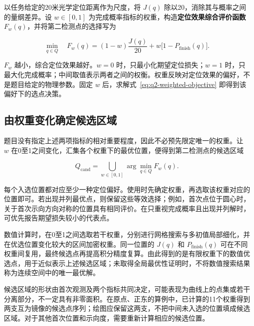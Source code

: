 以任务给定的20米光学定位距离作为尺度，将 \(J(q)\) 除以20，消除其与概率之间的量纲差异。设 \(w\in[0,1]\) 为完成概率指标的权重，构造\textbf{定位效果综合评价函数} \(F_w(q)\)，并将第二检测点的选择写为

\begin{equation}
 \min_{q\in Q}\quad F_w(q)
 =(1-w)\frac{J(q)}{20}+w\bigl[1-P_{\mathrm{finish}}(q)\bigr].
\label{eq:q2-weighted-objective}
\end{equation}

\(F_w\) 越小，综合定位效果越好。\(w=0\) 时，只最小化期望定位损失；\(w=1\) 时，只最大化完成概率；中间取值表示两者之间的权衡。权重反映对定位效果的偏好，不是题目给定的物理参数。固定 \(w\) 后，求解式~\eqref{eq:q2-weighted-objective} 即得到该偏好下的选点决策。

\subsection{由权重变化确定候选区域}

题目没有指定上述两项指标的相对重要程度，因此不必预先限定唯一的权重。让 \(w\) 在0至1之间变化，汇集各个权重下的最优位置，便得到第二检测点的候选区域

\begin{equation}
 Q_{\mathrm{cand}}=\bigcup_{w\in[0,1]}\arg\min_{q\in Q}F_w(q).
\label{eq:q2-candidate-region}
\end{equation}

每个入选位置都对应至少一种定位偏好。使用时先确定权重，再选取该权重对应的位置即可。若出现并列最优点，则保留这些等效选择；例如，首次点位于圆心时，关于首次示向方向对称的位置具有相同评价。在只重视完成概率且出现并列解时，可优先报告期望损失较小的代表点。

数值计算时，在0至1之间选取若干权重，分别进行网格搜索与多初值局部细化，并在优选位置变化较大的区间加密权重。同一位置的 \(J(q)\) 和 \(P_{\mathrm{finish}}(q)\) 可在不同权重间复用，最终候选点再提高积分精度复算。由此得到的是有限权重下的数值优选点，用于近似表示上述候选区域；未取得全局最优性证明时，不将数值搜索结果称为连续空间中的唯一最优解。

候选区域的形状由首次观测及两个指标共同决定，可能表现为曲线上的点集或若干分离部分，不一定具有非零面积。在原点、正东的算例中，已计算的11个权重得到两支互为镜像的候选点序列；绘图应保留这两支，不把中间未入选的位置填成候选区域。对于其他首次位置和示向度，需要重新计算相应的候选位置。

